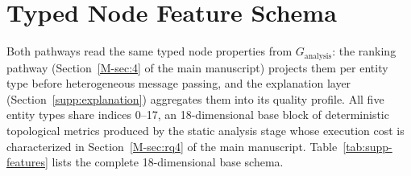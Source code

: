 \documentclass[preprint,3p]{elsarticle}
\begin{document}
\begin{table}[htbp]
\centering
\small
\caption{Paired Wilcoxon signed-rank tests across in-distribution scenarios ($n = 12$, two-sided).}
\label{tab:supp-indist-wilcoxon}
\end{table}

\section{Typed Node Feature Schema}
\label{supp:features}

Both pathways read the same typed node properties from $G_{\text{analysis}}$: the ranking pathway (Section~\ref{M-sec:4} of the main manuscript) projects them per entity type before heterogeneous message passing, and the explanation layer (Section~\ref{supp:explanation}) aggregates them into its quality profile. All five entity types share indices 0--17, an 18-dimensional base block of deterministic topological metrics produced by the static analysis stage whose execution cost is characterized in Section~\ref{M-sec:rq4} of the main manuscript. Table~\ref{tab:supp-features} lists the complete 18-dimensional base schema.
\end{document}
